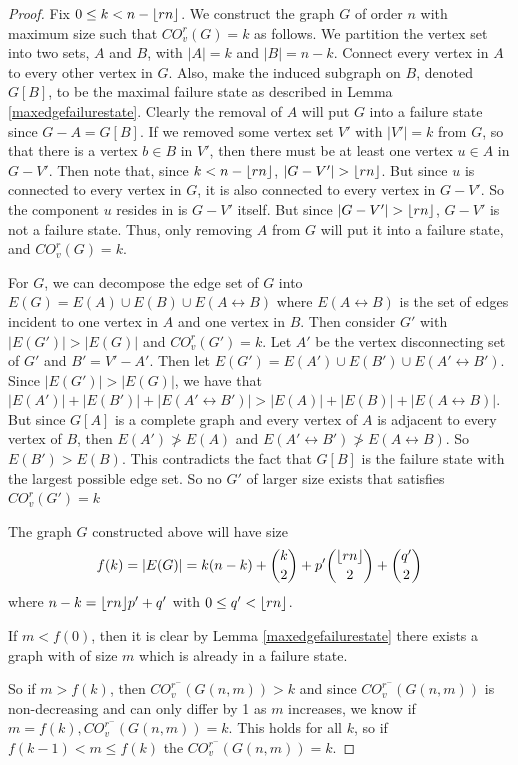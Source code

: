 \documentclass[12pt]{article}
\DeclarePairedDelimiter{\floor}{\lfloor}{\rfloor}
\theoremstyle{definition}
\newcommand{\COV}[2]{CO^{#1}_{v}(#2)}
\newcommand{\COVMIN}[1]{CO^{r^-}_{v}(#1)}
\begin{document}
\begin{proof}
Fix $0\le k < n - \floor{rn}$. We construct the graph $G$ of order $n$ with maximum size such that $\COV{r}{G}=k$ as follows. We partition the vertex set into two sets, $A$ and $B$, with $|A|=k$ and $|B|=n-k$. Connect every vertex in $A$ to every other vertex in $G$. Also, make the induced subgraph on $B$, denoted $G[B]$, to be the maximal failure state as described in Lemma \ref{maxedgefailurestate}. Clearly the removal of $A$ will put $G$ into a failure state since $G-A = G[B]$. If we removed some vertex set $V'$ with $|V'|=k$ from $G$, so that there is a vertex $b \in B$ in $V'$, then there must be at least one vertex $u\in A$ in $G-V'$. Then note that, since $k<n - \floor{rn}$, $|G-V'|>\floor{rn}$. But since $u$ is connected to every vertex in $G$, it is also connected to every vertex in $G-V'$. So the component $u$ resides in is $G-V'$ itself. But since $|G-V'|>\floor{rn}$, $G-V'$ is not a failure state. Thus, only removing $A$ from $G$ will put it into a failure state, and $\COV{r}{G}=k$.  

For $G$, we can decompose the edge set of $G$ into $E(G)=E(A)\cup E(B)\cup E(A\leftrightarrow B)$ where $E(A \leftrightarrow B)$ is the set of edges incident to one vertex in $A$ and one vertex in $B$. Then consider $G'$ with $|E(G')|>|E(G)|$ and $\COV{r}{G'}=k$. Let $A'$ be the vertex disconnecting set of $G'$ and $B'=V'-A'$. Then let $E(G')=E(A') \cup E(B') \cup E(A'\leftrightarrow B')$. Since $|E(G')|>|E(G)|$, we have that $|E(A')|+|E(B')|+|E(A'\leftrightarrow B')|>|E(A)|+|E(B)|+|E(A \leftrightarrow B)|$. But since $G[A]$ is a complete graph and every vertex of $A$ is adjacent to every vertex of $B$, then $E(A')\ngtr E(A)$ and $E(A' \leftrightarrow B') \ngtr E(A \leftrightarrow B)$. So $E(B')>E(B)$. This contradicts the fact that $G[B]$ is the failure state with the largest possible edge set. So no $G'$ of larger size exists that satisfies $\COV{r}{G'}=k$

The graph $G$ constructed above will have size
$$f(k) = |E(G)| = k(n-k) + \binom{k}{2} + p'\binom{\floor{rn}}{2} + \binom{q'}{2}$$
where $n-k = \floor{rn}p'+q'$ with $0 \leq q' < \floor{rn}$. 

If $m < f(0)$, then it is clear by Lemma \ref{maxedgefailurestate} there exists a graph with of size $m$ which is already in a failure state.

So if $m>f(k)$, then $\COVMIN{G(n,m)}>k$ and since $\COVMIN{G(n,m)}$ is non-decreasing and can only differ by 1 as $m$ increases, we know if $m = f(k), \COVMIN{G(n,m)}=k$. This holds for all $k$, so if $f(k-1) < m \leq f(k)$ the $\COVMIN{G(n,m)} = k$. 

\end{proof}
\end{document}
